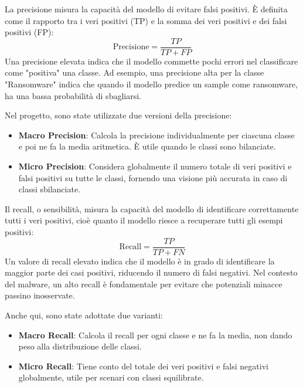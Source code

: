 La precisione misura la capacità del modello di evitare falsi positivi. È definita come il rapporto tra i veri positivi (TP) e la somma dei veri positivi e dei falsi positivi (FP):
\[
\text{Precisione} = \frac{TP}{TP + FP}
\]
Una precisione elevata indica che il modello commette pochi errori nel classificare come "positiva" una classe. Ad esempio, una precisione alta per la classe "Ransomware" indica che quando il modello predice un sample come ransomware, ha una bassa probabilità di sbagliarsi.

Nel progetto, sono state utilizzate due versioni della precisione:
\begin{itemize}
    \item \textbf{Macro Precision}: Calcola la precisione individualmente per ciascuna classe e poi ne fa la media aritmetica. È utile quando le classi sono bilanciate.
    \item \textbf{Micro Precision}: Considera globalmente il numero totale di veri positivi e falsi positivi su tutte le classi, fornendo una visione più accurata in caso di classi sbilanciate.
\end{itemize}

Il recall, o sensibilità, misura la capacità del modello di identificare correttamente tutti i veri positivi, cioè quanto il modello riesce a recuperare tutti gli esempi positivi:
\[
\text{Recall} = \frac{TP}{TP + FN}
\]
Un valore di recall elevato indica che il modello è in grado di identificare la maggior parte dei casi positivi, riducendo il numero di falsi negativi. Nel contesto del malware, un alto recall è fondamentale per evitare che potenziali minacce passino inosservate.

Anche qui, sono state adottate due varianti:
\begin{itemize}
    \item \textbf{Macro Recall}: Calcola il recall per ogni classe e ne fa la media, non dando peso alla distribuzione delle classi.
    \item \textbf{Micro Recall}: Tiene conto del totale dei veri positivi e falsi negativi globalmente, utile per scenari con classi squilibrate.
\end{itemize}

